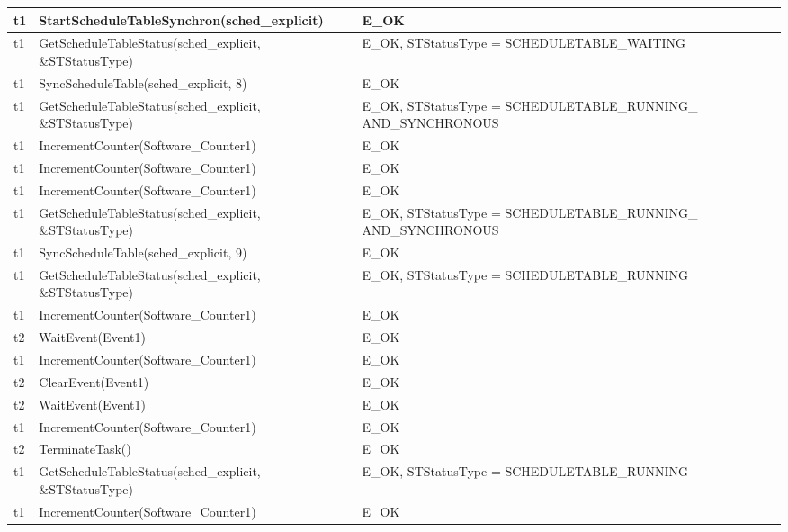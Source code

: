 \documentclass[10pt]{article}
\newlength{\Li}\settowidth{\Li}{Running}
\newlength{\Lii}\setlength{\Lii}{7cm}
\newlength{\Liiii}\setlength{\Liiii}{0.9cm}
\newlength{\Liii}\setlength{\Liii}{\textwidth} \addtolength{\Liii}{-\Li} \addtolength{\Liii}{-\Lii} \addtolength{\Liii}{-\Liiii}
\begin{document}
	\begin{supertabular}{|p{\Li}|p{\Lii}|p{\Liii}|p{\Liiii}|} \hline 
	t1		& StartScheduleTableSynchron(sched\_explicit)					& E\_OK																	& \\ \hline
	t1		& GetScheduleTableStatus(sched\_explicit, \&STStatusType)			& E\_OK, STStatusType = SCHEDULETABLE\_WAITING								& \\ \hline
	t1		& SyncScheduleTable(sched\_explicit, 8)							& E\_OK																	& \\ \hline
	t1		& GetScheduleTableStatus(sched\_explicit, \&STStatusType)			& E\_OK, STStatusType = SCHEDULETABLE\_RUNNING\_ AND\_SYNCHRONOUS		& \\ \hline
	t1		& IncrementCounter(Software\_Counter1)						& E\_OK																	& \\ \hline
	t1		& IncrementCounter(Software\_Counter1)						& E\_OK																	& \\ \hline
	t1		& IncrementCounter(Software\_Counter1)						& E\_OK																	& \\ \hline
	t1		& GetScheduleTableStatus(sched\_explicit, \&STStatusType)			& E\_OK, STStatusType = SCHEDULETABLE\_RUNNING\_ AND\_SYNCHRONOUS		& \\ \hline
	t1		& SyncScheduleTable(sched\_explicit, 9)							& E\_OK																	& \\ \hline
	t1		& GetScheduleTableStatus(sched\_explicit, \&STStatusType)			& E\_OK, STStatusType = SCHEDULETABLE\_RUNNING 							& \\ \hline
	t1		& IncrementCounter(Software\_Counter1)						& E\_OK																	& \\ \hline
	t2		& WaitEvent(Event1)											& E\_OK																	& \\ \hline
	t1		& IncrementCounter(Software\_Counter1)						& E\_OK																	& \\ \hline
	t2		& ClearEvent(Event1)										& E\_OK																	& \\ \hline
	t2		& WaitEvent(Event1)											& E\_OK																	& \\ \hline
	t1		& IncrementCounter(Software\_Counter1)						& E\_OK																	& \\ \hline
	t2		& TerminateTask()											& E\_OK																	& \\ \hline
	t1		& GetScheduleTableStatus(sched\_explicit, \&STStatusType)			& E\_OK, STStatusType = SCHEDULETABLE\_RUNNING 							& \\ \hline
	t1		& IncrementCounter(Software\_Counter1)						& E\_OK																	& \\ \hline

\end{supertabular}
\end{document}
